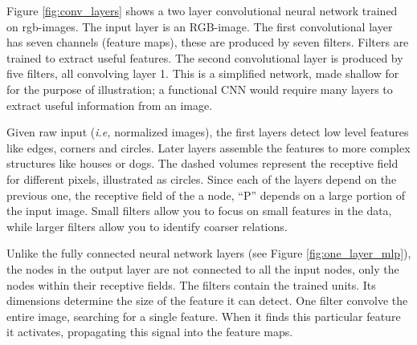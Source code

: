 Figure \ref{fig:conv_layers} shows a two layer convolutional neural network trained on \acrshort{rgb}-images. The input layer is an RGB-image. The first convolutional layer has seven channels (feature maps), these are produced by seven filters. Filters are trained to extract useful features. The second convolutional layer is produced by five filters, all convolving layer 1. This is a simplified network, made shallow for for the purpose of illustration; a functional CNN would require many layers to extract useful information from an image. %

Given raw input (\textit{i.e,} normalized images), the first layers detect low level features like edges, corners and circles. Later layers assemble the features to more complex structures like houses or dogs. The dashed volumes represent the receptive field for different pixels, illustrated as circles. Since each of the layers depend on the previous one, the receptive field of the a node, ``P'' depends on a large portion of the input image. Small filters allow you to focus on small features in the data, while larger filters allow you to identify coarser relations.

Unlike the fully connected neural network layers (see Figure \ref{fig:one_layer_mlp}), the nodes in the output layer are not connected to all the input nodes, only the nodes within their receptive fields. The filters contain the trained units. Its dimensions determine the size of the feature it can detect. One filter convolve the entire image, searching for a single feature.  When it finds this particular feature it activates, propagating this signal into the feature maps.


